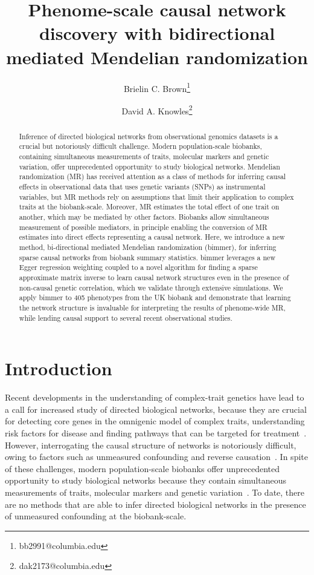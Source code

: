 \documentclass{article}
\title{Phenome-scale causal network discovery with
bidirectional mediated Mendelian randomization}
\author[1, 2]{Brielin C. Brown\thanks{bb2991@columbia.edu}}
\author[2, 3, 4]{David A. Knowles\thanks{dak2173@columbia.edu}}
\affil[1]{Data Science Institute, Columbia University, New York, NY}
\affil[2]{New York Genome Center, New York, NY}
\affil[3]{Department of Computer Science, Columbia University, New York, NY}
\affil[4]{Department of Systems Biology, Columbia University, New York, NY}
\date{}
\begin{document}
\maketitle

\begin{abstract}
Inference of directed biological networks from observational genomics datasets is a crucial
but notoriously difficult challenge. Modern population-scale biobanks, containing simultaneous
measurements of traits, molecular markers and genetic variation, offer unprecedented opportunity
to study biological networks. Mendelian randomization (MR) has received attention as a class
of methods for inferring causal effects in observational data that uses genetic variants (SNPs)
as instrumental variables, but MR methods rely on assumptions that limit their application
to complex traits at the biobank-scale. Moreover, MR estimates the total effect of one trait 
on another, which may be mediated by other factors. Biobanks allow simultaneous measurement 
of possible mediators, in principle enabling the conversion of MR estimates into direct effects 
representing a causal network. Here, we introduce a new method, bi-directional mediated Mendelian 
randomization (bimmer), for inferring sparse causal networks from biobank summary statistics. 
bimmer leverages a new Egger regression weighting coupled to a novel algorithm for finding a sparse
approximate matrix inverse to learn causal network structures even in the presence of non-causal 
genetic correlation, which we validate through extensive simulations. We apply bimmer to 405 
phenotypes from the UK biobank and demonstrate that learning the network structure is invaluable 
for interpreting the results of phenome-wide MR, while lending causal support to several
recent observational studies.
\end{abstract}

\section{Introduction}
Recent developments in the understanding of complex-trait genetics have
lead to a call for increased study of directed biological networks, because they are
crucial for detecting core genes in the omnigenic model of complex traits,
understanding risk factors for disease and finding pathways that can be targeted
for treatment~\cite{Boyle2017,Liu2019,Wray2018}.
However, interrogating the causal structure of networks is notoriously difficult,
owing to factors such as unmeasured confounding and reverse causation~\cite{Parsana2019}.
In spite of these challenges, modern population-scale biobanks 
offer unprecedented opportunity to study biological networks
 because they contain simultaneous measurements of
traits, molecular markers and genetic variation~\cite{Sudlow2015,Nagai2017}. To date,
there are no methods that are able to infer directed biological networks
in the presence of unmeasured confounding at the biobank-scale.
\end{document}
